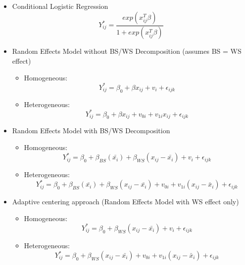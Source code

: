 \documentclass{article}
\begin{document}
        
        \begin{itemize}
            \item Conditional Logistic Regression \\
                \begin{equation} Y_{ij}^* = \frac{exp(x_{ij}^T\beta)}{1+exp(x_{ij}^T\beta)} \end{equation}
            \item Random Effects Model without BS/WS Decomposition (assumes BS = WS effect)
                \begin{itemize}
                \item Homogeneous:
                \begin{equation}
                    Y_{ij}^* = \beta_{0} + \beta x_{ij} + v_i + \epsilon_{ijk} 
                \end{equation}
                \item Heterogeneous:
                \begin{equation}
                 Y_{ij}^* = \beta_{0} + \beta x_{ij} + v_{0i} + v_{1i}x_{ij} + \epsilon_{ijk} 
                 \end{equation}
                 \end{itemize}
            \item Random Effects Model with BS/WS Decomposition
                \begin{itemize}
                    \item Homogeneous:
                    \begin{equation}
                 Y_{ij}^* = \beta_{0} + \beta_{BS}(\bar{x_i}) + \beta_{WS}(x_{ij} - \bar{x_i}) + v_i + \epsilon_{ijk}
                 \end{equation}
                    \item Heterogeneous: 
                    \begin{equation}
                 Y_{ij}^* = \beta_{0} + \beta_{BS}(\bar{x_i}) + \beta_{WS}(x_{ij} - \bar{x_i}) + v_{0i} + v_{1i}(x_{ij}-\bar{x}_i) + \epsilon_{ijk} 
                 \end{equation}
                \end{itemize}
            \item Adaptive centering approach (Random Effects Model with WS effect only)
                \begin{itemize}
                    \item Homogeneous:
                    \begin{equation}
                    Y_{ij}^* = \beta_{0} + \beta_{WS}(x_{ij} - \bar{x_i}) + v_i + \epsilon_{ijk} 
                    \end{equation}
                    \item Heterogeneous:
                    \begin{equation}
                    Y_{ij}^* = \beta_{0} + \beta_{WS}(x_{ij} - \bar{x_i}) + v_{0i} + v_{1i}(x_{ij}-\bar{x}_i) + \epsilon_{ijk} 
                  \end{equation}
                \end{itemize}
        \end{itemize}  
\end{document}
